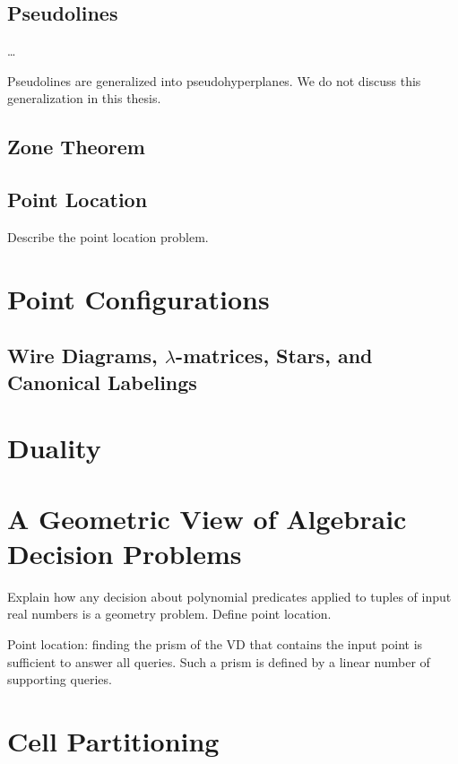 \subsection{Pseudolines}
\dots

Pseudolines are generalized into pseudohyperplanes. We do not discuss this
generalization in this thesis.

\subsection{Zone Theorem}


\subsection{Point Location}
Describe the point location problem.


\section{Point Configurations}

\subsection{Wire Diagrams, \(\lambda\)-matrices, Stars, and Canonical Labelings}





\section{Duality}


\section{A Geometric View of Algebraic Decision Problems}

Explain how any decision about polynomial predicates applied to tuples of input
real numbers is a geometry problem. Define point location.

Point location: finding the prism of the VD that contains the input point is
sufficient to answer all queries. Such a prism is defined by a linear number of
supporting queries.


\section{Cell Partitioning}

